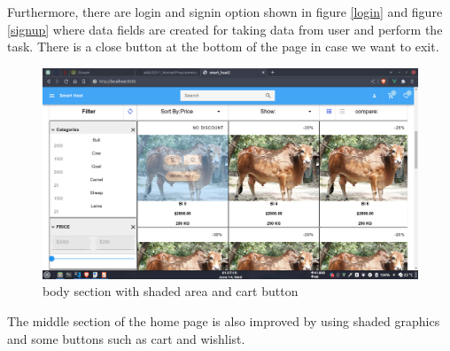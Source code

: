 \documentclass[a4paper,12pt]{report}
\begin{document}
Furthermore, there are login and signin option shown in figure \ref{login} and figure \ref{signup} where data fields are created for taking data from user and perform the task. There is a close button at the bottom of the page in case we want to exit.

\begin{figure}[H]
	\includegraphics[keepaspectratio, width=\linewidth]{body.png}
	\caption{body section with shaded area and cart button}
	\label{body}
\end{figure}
The middle section of the home page is also improved by using shaded graphics and some buttons such as cart and wishlist.
\end{document}
